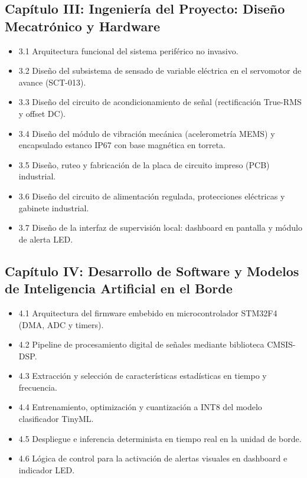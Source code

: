 \subsection*{Capítulo III: Ingeniería del Proyecto: Diseño Mecatrónico y Hardware}
\begin{itemize}
    \item 3.1 Arquitectura funcional del sistema periférico no invasivo.
    \item 3.2 Diseño del subsistema de sensado de variable eléctrica en el servomotor de avance (SCT-013).
    \item 3.3 Diseño del circuito de acondicionamiento de señal (rectificación True-RMS y offset DC).
    \item 3.4 Diseño del módulo de vibración mecánica (acelerometría MEMS) y encapsulado estanco IP67 con base magnética en torreta.
    \item 3.5 Diseño, ruteo y fabricación de la placa de circuito impreso (PCB) industrial.
    \item 3.6 Diseño del circuito de alimentación regulada, protecciones eléctricas y gabinete industrial.
    \item 3.7 Diseño de la interfaz de supervisión local: dashboard en pantalla y módulo de alerta LED.
\end{itemize}

\subsection*{Capítulo IV: Desarrollo de Software y Modelos de Inteligencia Artificial en el Borde}
\begin{itemize}
    \item 4.1 Arquitectura del firmware embebido en microcontrolador STM32F4 (DMA, ADC y timers).
    \item 4.2 Pipeline de procesamiento digital de señales mediante biblioteca CMSIS-DSP.
    \item 4.3 Extracción y selección de características estadísticas en tiempo y frecuencia.
    \item 4.4 Entrenamiento, optimización y cuantización a INT8 del modelo clasificador TinyML.
    \item 4.5 Despliegue e inferencia determinista en tiempo real en la unidad de borde.
    \item 4.6 Lógica de control para la activación de alertas visuales en dashboard e indicador LED.
\end{itemize}

